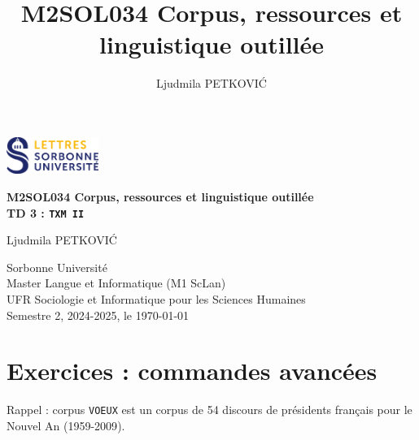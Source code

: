 \documentclass[xcolor={table,usenames,dvipsnames}]{article}
\author{Ljudmila PETKOVI\'C}
\title{\textbf{\textsc{M2SOL034} Corpus, ressources et linguistique outillée}}
\begin{document}
	
	\begin{center}
		\includegraphics[width=3cm]{img/logo.png} %
	\end{center}
	
	\begin{tcolorbox}[colback=myblue!10, colframe=myblue, width=\textwidth, sharp corners, boxrule=1pt]
		\centering
		\Large \textbf{\textsc{M2SOL034} Corpus, ressources et linguistique outillée\\{\large\textsc{TD 3} : \texttt{TXM II}}}
	\end{tcolorbox}
	
	\begin{center}
		Ljudmila PETKOVI\'C
		
		{\small Sorbonne Université\\Master \og{}Langue et Informatique\fg{} (\textsc{M1} ScLan)\\\textsc{UFR} Sociologie et Informatique pour les Sciences Humaines\\Semestre 2, 2024-2025, le \today}
	\end{center}
	


		
	\tableofcontents
	
	\bigskip
	
	\section{Exercices : commandes avancées}  %
	Rappel : corpus \texttt{VOEUX} est un corpus de 54 discours de présidents français pour le Nouvel An (\textsc{1959-2009}).
	
\end{document}
